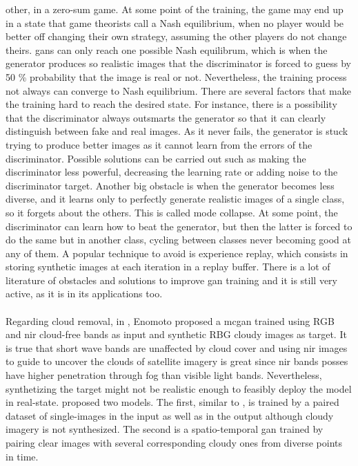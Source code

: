 \documentclass[11pt, a4paper]{article}
\begin{document}
	other, in a zero-sum game. At some point of the training, the game may end up in a state that
	game theorists call a Nash equilibrium, when no player would be better off changing their own strategy, assuming the other players do not change theirs. \gls{gan}s can only reach one possible Nash equilibrum, which is when the generator produces so realistic images that the discriminator is forced to guess by 50 \% probability that the image is real or not. Nevertheless, the training process not always can converge to Nash equilibrium. There are several factors that make the training hard to reach the desired state. For instance, there is a possibility that the discriminator always outsmarts the generator so that it can clearly distinguish between fake and real images. As it never fails, the generator is stuck trying to produce better images as it cannot learn from the errors of the discriminator. Possible solutions can be carried out such as making the discriminator less powerful, decreasing the learning rate or adding noise to the discriminator target. Another big obstacle is when the generator becomes less diverse, and it learns only to perfectly generate realistic images of a single class, so it forgets about the others. This is  called mode collapse. At some point, the discriminator can learn how to beat the generator, but then the latter is forced to do the same but in another class, cycling between classes never becoming good at any of them. A popular technique to avoid is experience replay, which consists in storing synthetic images at each iteration in a replay buffer. There is a lot of literature of obstacles and solutions to improve \gls{gan} training and it is still very active, as it is in its applications too.
	\\
	\\
	Regarding cloud removal, in \cite{8014931}, Enomoto %
	proposed a  \gls{mcgan} trained using RGB and \gls{nir} cloud-free bands as input and synthetic RBG cloudy images as target. It is true that short wave bands are unaffected by cloud cover and using \gls{nir} images to guide to uncover the clouds of satellite imagery is great since \gls{nir} bands posses have higher penetration through fog than visible light bands. Nevertheless, synthetizing the target might not be realistic enough to feasibly deploy the model in real-state. \cite{sarukkai2019cloud} proposed two models. The first, similar to \cite{8014931}, is trained by a paired dataset of single-images in the input as well as in the output although cloudy imagery is not synthesized. The second is a spatio-temporal \gls{gan} trained by pairing clear images with several corresponding cloudy ones from diverse points in time. 
\end{document}
